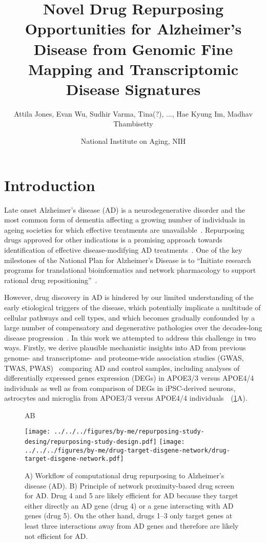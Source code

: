 \documentclass[letterpaper]{article}
\title{Novel Drug Repurposing Opportunities for Alzheimer's Disease from
  Genomic Fine Mapping and Transcriptomic Disease Signatures}
\author{Attila Jones, Evan Wu, Sudhir Varma, Tina(?), ..., Hae Kyung Im, Madhav Thambisetty}
\date{National Institute on Aging, NIH}
\begin{document}
\maketitle

\section{Introduction}

Late onset Alzheimer's disease (AD) is a neurodegenerative disorder and the most
common form of dementia affecting a growing number of individuals in ageing
societies for which effective treatments are
unavailable~\citep{Bondi2017,Masters2015}.  Repurposing drugs approved for other indications is
a promising approach  towards identification of effective disease-modifying AD
treatments~\citep{Pushpakom2019,Fang2021,Taubes2021}.  One of the key
milestones of the National Plan for Alzheimer’s Disease is to ``Initiate
research programs for translational bioinformatics and network pharmacology to
support rational drug repositioning''~\citep{Aging}.

However, drug discovery in AD is hindered by our limited understanding of the
early etiological triggers of the disease, which potentially implicate a
multitude of cellular pathways and cell types, and which becomes gradually
confounded by a large number of compensatory and degenerative pathologies over
the decades-long disease progression~\citep{DeStrooper2016}.  In this work we
attempted to address this challenge in two ways.  Firstly, we derive plausible
mechanistic insights into AD from previous genome- and transcriptome- and
proteome-wide association studies (GWAS, TWAS,
PWAS)~\citep{Jansen2019,Kunkle2019,Gerring2020,Baird2021,Schwartzentruber2021,Wightman2021,Wingo2021}
comparing AD and control samples, including analyses of differentially
expressed genes expression (DEGs) in APOE3/3 versus APOE4/4 individuals as
well as from comparison of DEGs in iPSC-derived neurons, astrocytes and
microglia from APOE3/3 versus APOE4/4
individuals~\citep{Taubes2021,Lin2018}~(\ref{fig:workflow}A).

\begin{figure}
\hspace{0.05\textwidth}A\hspace{0.7\textwidth}B

\texttt{[image: ../../../figures/by-me/repurposing-study-desing/repurposing-study-design.pdf]}
\texttt{[image: ../../../figures/by-me/drug-target-disgene-network/drug-target-disgene-network.pdf]}
\caption{
  A) Workflow of computational drug repurposing to Alzheimer's disease (AD).
  B) Principle of network proximity-based drug screen for AD.  Drug 4 and 5 are
  likely efficient for AD because they target either directly an AD gene (drug
  4) or a gene interacting with AD genes (drug 5).  On the other hand, drugs
  1--3 only target genes at least three interactions away from AD genes and
  therefore are likely not efficient for AD.
}
\label{fig:workflow}
\end{figure}
\end{document}
